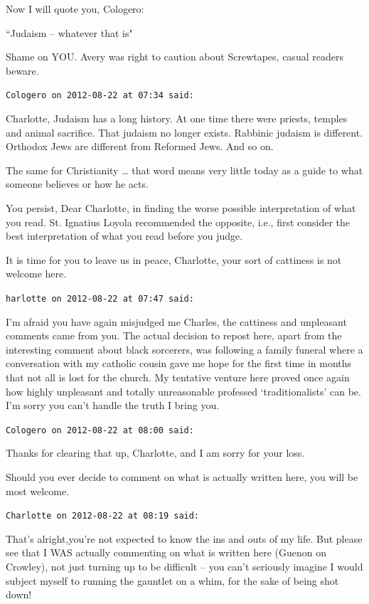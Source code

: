 \begin{footnotesize}
\begin{sffamily}
Now I will quote you, Cologero:

``Judaism – whatever that is"

Shame on YOU. Avery was right to caution about Screwtapes, casual readers beware.


\hfill

\texttt{Cologero on 2012-08-22 at 07:34 said: }

Charlotte, Judaism has a long history. At one time there were priests, temples and animal sacrifice. That judaism no longer exists. Rabbinic judaism is different. Orthodox Jews are different from Reformed Jews. And so on.

The same for Christianity … that word means very little today as a guide to what someone believes or how he acts.

You persist, Dear Charlotte, in finding the worse possible interpretation of what you read. St. Ignatius Loyola recommended the opposite, i.e., first consider the best interpretation of what you read before you judge.

It is time for you to leave us in peace, Charlotte, your sort of cattiness is not welcome here.


\hfill

\texttt{harlotte on 2012-08-22 at 07:47 said: }

I'm afraid you have again misjudged me Charles, the cattiness and unpleasant comments came from you. The actual decision to repost here, apart from the interesting comment about black sorcerers, was following a family funeral where a conversation with my catholic cousin gave me hope for the first time in months that not all is lost for the church. My tentative venture here proved once again how highly unpleasant and totally unreasonable professed `traditionalists' can be. I'm sorry you can't handle the truth I bring you.


\hfill

\texttt{Cologero on 2012-08-22 at 08:00 said: }

Thanks for clearing that up, Charlotte, and I am sorry for your loss.

Should you ever decide to comment on what is actually written here, you will be most welcome.


\hfill

\texttt{Charlotte on 2012-08-22 at 08:19 said: }

That's alright,you're not expected to know the ins and outs of my life. But please see that I WAS actually commenting on what is written here (Guenon on Crowley), not just turning up to be difficult – you can't seriously imagine I would subject myself to running the gauntlet on a whim, for the sake of being shot down! 


\end{sffamily}
\end{footnotesize}
